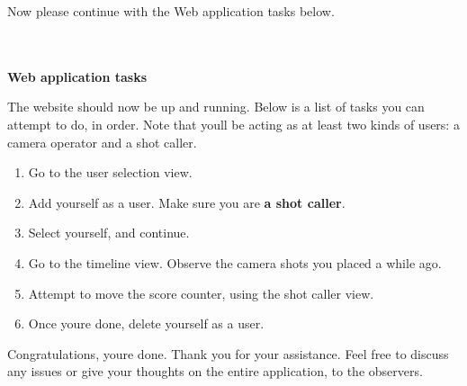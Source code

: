 Now please continue with the Web application tasks below.\\\\\\
\begin{large}
\textbf{Web application tasks}\\
\end{large}
The website should now be up and running. Below is a list of tasks you can attempt to do, in order. Note that you\textquotesingle ll be acting as at least two kinds of users: a camera operator and a shot caller.\\
\begin{enumerate}
\item Go to the user selection view.
\item Add yourself as a user. Make sure you are \textbf{a shot caller}.
\item Select yourself, and continue.
\item Go to the timeline view. Observe the camera shots you placed a while ago.
\item Attempt to move the score counter, using the shot caller view.
\item Once you\textquotesingle re done, delete yourself as a user.
\end{enumerate}
Congratulations, you\textquotesingle re done. Thank you for your assistance. Feel free to discuss any issues or give your thoughts on the entire application, to the observers.
